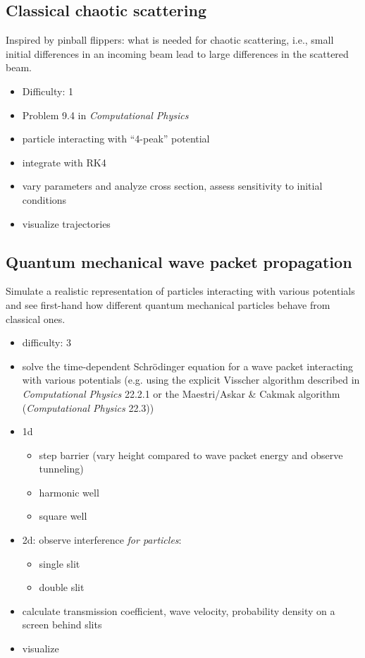 \documentclass[letterpaper]{scrartcl}
\begin{document}
\subsection{Classical chaotic scattering}

Inspired by pinball flippers: what is needed for chaotic scattering,
i.e., small initial differences in an incoming beam lead to large
differences in the scattered beam.

\begin{itemize}
\item Difficulty: 1
\item Problem 9.4 in \emph{Computational Physics}
\item particle interacting with ``4-peak'' potential
\item integrate with RK4
\item vary parameters and analyze cross section, assess sensitivity
  to initial conditions
\item visualize trajectories
\end{itemize}



\subsection{Quantum mechanical wave packet propagation}

Simulate a realistic representation of particles interacting with
various potentials and see first-hand how different quantum mechanical
particles behave from classical ones.

\begin{itemize}
\item difficulty: 3
\item solve the time-dependent Schr\"odinger equation for a wave
  packet interacting with various potentials (e.g. using the explicit
  Visscher algorithm described in \emph{Computational Physics} 22.2.1
  or the Maestri/Askar \& Cakmak algorithm (\emph{Computational
    Physics} 22.3))
\item 1d
  \begin{itemize}
  \item step barrier (vary height compared to wave packet energy and
    observe tunneling)
  \item harmonic well
  \item square well
  \end{itemize}
\item 2d: observe interference \emph{for particles}:
  \begin{itemize}
  \item single slit
  \item double slit
  \end{itemize}
\item calculate transmission coefficient, wave
  velocity, probability density on a screen behind slits
\item visualize
\end{itemize}
\end{document}
